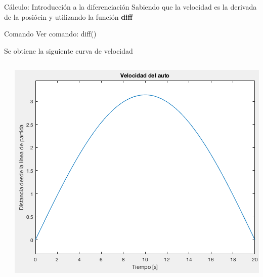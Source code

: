 \documentclass{bredelebeamer}
\begin{document}
\begin{frame}{Cálculo: Introducción a la diferenciación}
Sabiendo que la velocidad es la derivada de la posiócin y utilizando la función \textbf{diff}
\begin{exampleblock}{Comando}
Ver comando: diff()
\end{exampleblock}
Se obtiene la siguiente curva de velocidad
\begin{columns}
\begin{column}{0.5\textwidth}
\end{column}
\begin{column}{0.5\textwidth}
\begin{center}
\includegraphics[scale=0.3]{images/fig7.png}
\end{center}
\end{column}
\end{columns}
\end{frame}
\end{document}
